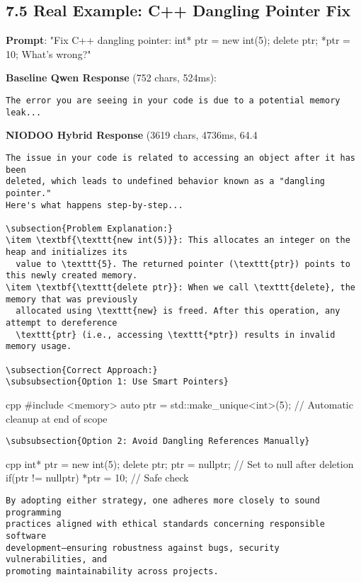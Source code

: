 \documentclass[11pt,a4paper]{article}
\begin{document}
\subsection{7.5 Real Example: C++ Dangling Pointer Fix}

\textbf{Prompt}: "Fix C++ dangling pointer: int* ptr = new int(5); delete ptr; *ptr = 10; What's wrong?"

\textbf{Baseline Qwen Response} (752 chars, 524ms):
\begin{verbatim}The error you are seeing in your code is due to a potential memory leak...
\end{verbatim}

\textbf{NIODOO Hybrid Response} (3619 chars, 4736ms, 64.4%
\begin{verbatim}The issue in your code is related to accessing an object after it has been 
deleted, which leads to undefined behavior known as a "dangling pointer." 
Here's what happens step-by-step...

\subsection{Problem Explanation:}
\item \textbf{\texttt{new int(5)}}: This allocates an integer on the heap and initializes its 
  value to \texttt{5}. The returned pointer (\texttt{ptr}) points to this newly created memory.
\item \textbf{\texttt{delete ptr}}: When we call \texttt{delete}, the memory that was previously 
  allocated using \texttt{new} is freed. After this operation, any attempt to dereference 
  \texttt{ptr} (i.e., accessing \texttt{*ptr}) results in invalid memory usage.

\subsection{Correct Approach:}
\subsubsection{Option 1: Use Smart Pointers}
\end{verbatim}cpp
#include <memory>
auto ptr = std::make_unique<int>(5);
// Automatic cleanup at end of scope
\begin{verbatim}
\subsubsection{Option 2: Avoid Dangling References Manually}
\end{verbatim}cpp
int* ptr = new int(5);
delete ptr;
ptr = nullptr;  // Set to null after deletion
if(ptr != nullptr) {
    *ptr = 10;  // Safe check
}
\begin{verbatim}
By adopting either strategy, one adheres more closely to sound programming 
practices aligned with ethical standards concerning responsible software 
development—ensuring robustness against bugs, security vulnerabilities, and 
promoting maintainability across projects.
\end{verbatim}
\end{document}
